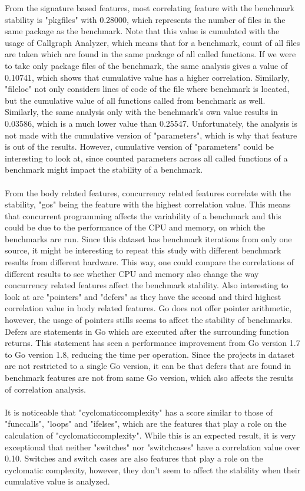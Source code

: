 \documentclass{seal_thesis}
\begin{document}
From the signature based features, most correlating feature with the benchmark stability is "pkgfiles" with 0.28000, which represents the number of files in the same package as the benchmark. Note that this value is cumulated with the usage of Callgraph Analyzer, which means that for a benchmark, count of all files are taken which are found in the same package of all called functions. If we were to take only package files of the benchmark, the same analysis gives a value of 0.10741, which shows that cumulative value has a higher correlation. Similarly, "fileloc" not only considers lines of code of the file where benchmark is located, but the cumulative value of all functions called from benchmark as well. Similarly, the same analysis only with the benchmark's own value results in 0.03586, which is a much lower value than 0.25547. Unfortunately, the analysis is not made with the cumulative version of "parameters", which is why that feature is out of the results. However, cumulative version of "parameters" could be interesting to look at, since counted parameters across all called functions of a benchmark might impact the stability of a benchmark.\\
\\
From the body related features, concurrency related features correlate with the stability, "gos" being the feature with the highest correlation value. This means that concurrent programming affects the variability of a benchmark and this could be due to the performance of the CPU and memory, on which the benchmarks are run. Since this dataset has benchmark iterations from only one source, it might be interesting to repeat this study with different benchmark results from different hardware. This way, one could compare the correlations of different results to see whether CPU and memory also change the way concurrency related features affect the benchmark stability. Also interesting to look at are "pointers" and "defers" as they have the second and third highest correlation value in body related features. Go does not offer pointer arithmetic, however, the usage of pointers stills seems to affect the stability of benchmarks. Defers are statements in Go which are executed after the surrounding function returns. This statement has seen a performance improvement from Go version 1.7 to Go version 1.8, reducing the time per operation. Since the projects in dataset are not restricted to a single Go version, it can be that defers that are found in benchmark features are not from same Go version, which also affects the results of correlation analysis.\\
\\
It is noticeable that "cyclomaticcomplexity" has a score similar to those of "funccalls", "loops" and "ifelses", which are the features that play a role on the calculation of "cyclomaticcomplexity". While this is an expected result, it is very exceptional that neither "switches" nor "switchcases" have a correlation value over 0.10. Switches and switch cases are also features that play a role on the cyclomatic complexity, however, they don't seem to affect the stability when their cumulative value is analyzed.
\end{document}
